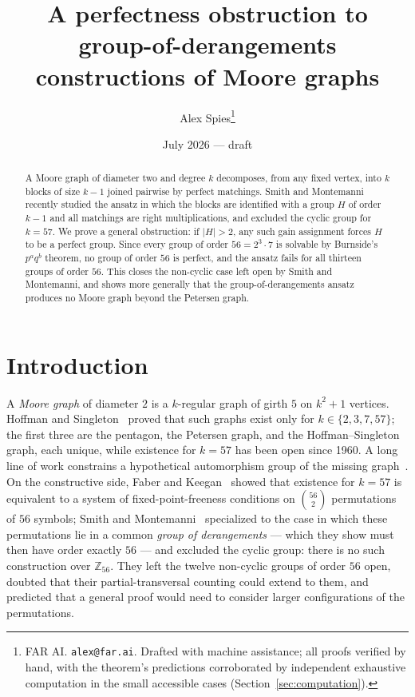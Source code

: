 \documentclass[10pt]{article}
\title{A perfectness obstruction to group-of-derangements\\
constructions of Moore graphs}
\author{Alex Spies\thanks{FAR AI. \texttt{alex@far.ai}. Drafted with
machine assistance; all proofs verified by hand, with the theorem's
predictions corroborated by independent exhaustive computation in the
small accessible cases (Section~\ref{sec:computation}).}}
\date{July 2026 --- draft}
\begin{document}
\maketitle

\begin{abstract}
A Moore graph of diameter two and degree $k$ decomposes, from any fixed
vertex, into $k$ blocks of size $k-1$ joined pairwise by perfect
matchings. Smith and Montemanni recently studied the ansatz in which the
blocks are identified with a group $H$ of order $k-1$ and all matchings
are right multiplications, and excluded the cyclic group for $k=57$. We
prove a general obstruction: if $|H|>2$, any such gain assignment forces
$H$ to be a perfect group. Since every group of order $56=2^3\cdot 7$ is
solvable by Burnside's $p^aq^b$ theorem, no group of order $56$ is
perfect, and the ansatz fails for all thirteen groups of order $56$.
This closes the non-cyclic case left open by Smith and Montemanni, and
shows more generally that the group-of-derangements ansatz produces no
Moore graph beyond the Petersen graph.
\end{abstract}

\section{Introduction}

A \emph{Moore graph} of diameter $2$ is a $k$-regular graph of girth $5$
on $k^2+1$ vertices. Hoffman and Singleton~\cite{HS1960} proved that
such graphs exist only for $k\in\{2,3,7,57\}$; the first three are the
pentagon, the Petersen graph, and the Hoffman--Singleton graph, each
unique, while existence for $k=57$ has been open since 1960. A long line
of work constrains a hypothetical automorphism group of the missing
graph~\cite{Higman,MacajSiran2010,Ishida2026}. On the constructive side,
Faber and Keegan~\cite{FK2022} showed that existence for $k=57$ is
equivalent to a system of fixed-point-freeness conditions on
$\binom{56}{2}$ permutations of $56$ symbols; Smith and
Montemanni~\cite{SM2026} specialized to the case in which these
permutations lie in a common \emph{group of derangements} --- which
they show must then have order exactly $56$ --- and excluded the cyclic
group: there is no such construction over $\mathbb{Z}_{56}$. They left
the twelve non-cyclic groups of order $56$ open, doubted that their
partial-transversal counting could extend to them, and predicted that a
general proof would need to consider larger configurations of the
permutations.
\end{document}
